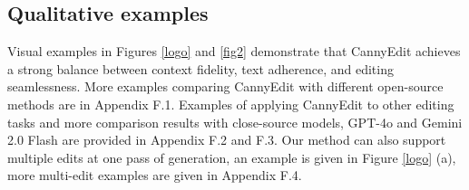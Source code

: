 \documentclass{article}
\begin{document}
\vspace{-1mm}
\subsection{Qualitative examples}

\vspace{-1mm}
Visual examples in Figures \ref{logo} and \ref{fig2} demonstrate that CannyEdit achieves a strong balance between context fidelity, text adherence, and editing seamlessness. More examples comparing CannyEdit with different open-source methods are in Appendix F.1. Examples of applying CannyEdit to other editing tasks and more comparison results with close-source models, GPT-4o \citep{OpenAI2025Introducing4O} and Gemini 2.0 Flash \citep{google_gemini2025} are provided in Appendix F.2 and F.3. Our method can also support multiple edits at one pass of generation, an example is given in Figure \ref{logo} (a), more multi-edit examples are given in Appendix F.4.  



\end{document}
